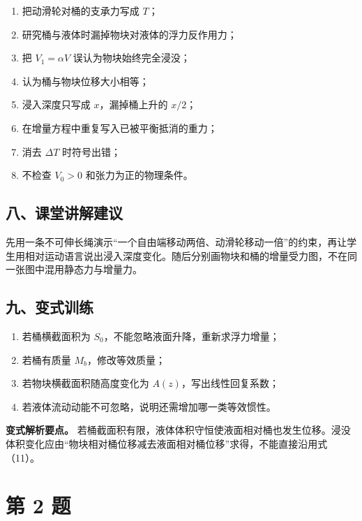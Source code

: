 \documentclass[12pt,a4paper,UTF8]{ctexart}
\newcommand{\tightlist}{\setlength{\itemsep}{0pt}\setlength{\parskip}{0pt}}
\begin{document}
\begin{enumerate}
\def\labelenumi{\arabic{enumi}.}
\tightlist
\item
  把动滑轮对桶的支承力写成 \(T\)；
\item
  研究桶与液体时漏掉物块对液体的浮力反作用力；
\item
  把 \(V_1=\alpha V\) 误认为物块始终完全浸没；
\item
  认为桶与物块位移大小相等；
\item
  浸入深度只写成 \(x\)，漏掉桶上升的 \(x/2\)；
\item
  在增量方程中重复写入已被平衡抵消的重力；
\item
  消去 \(\Delta T\) 时符号出错；
\item
  不检查 \(V_0>0\) 和张力为正的物理条件。
\end{enumerate}

\subsection{八、课堂讲解建议}\label{ux516bux8bfeux5802ux8bb2ux89e3ux5efaux8bae}

先用一条不可伸长绳演示``一个自由端移动两倍、动滑轮移动一倍''的约束，再让学生用相对运动语言说出浸入深度变化。随后分别画物块和桶的增量受力图，不在同一张图中混用静态力与增量力。

\subsection{九、变式训练}\label{ux4e5dux53d8ux5f0fux8badux7ec3}

\begin{enumerate}
\def\labelenumi{\arabic{enumi}.}
\tightlist
\item
  若桶横截面积为 \(S_0\)，不能忽略液面升降，重新求浮力增量；
\item
  若桶有质量 \(M_b\)，修改等效质量；
\item
  若物块横截面积随高度变化为 \(A(z)\)，写出线性回复系数；
\item
  若液体流动动能不可忽略，说明还需增加哪一类等效惯性。
\end{enumerate}

\textbf{变式解析要点。}
若桶截面积有限，液体体积守恒使液面相对桶也发生位移。浸没体积变化应由``物块相对桶位移减去液面相对桶位移''求得，不能直接沿用式（11）。

\newpage

\section{第 2 题}\label{ux7b2c-2-ux9898}
\end{document}
